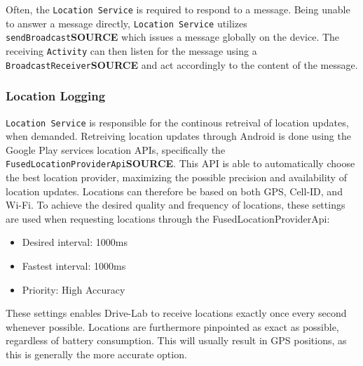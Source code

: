 Often, the \texttt{Location Service} is required to respond to a message. Being unable to answer a message directly, \texttt{Location Service} utilizes \texttt{sendBroadcast}\textbf{SOURCE} which issues a message globally on the device. The receiving \texttt{Activity} can then listen for the message using a \texttt{BroadcastReceiver}\textbf{SOURCE} and act accordingly to the content of the message. 

\subsubsection{Location Logging}\label{subsubsec:location_logging}
\texttt{Location Service} is responsible for the continous retreival of location updates, when demanded. Retreiving location updates through Android is done using the Google Play services location APIs, specifically the \texttt{FusedLocationProviderApi}\textbf{SOURCE}. This API is able to automatically choose the best location provider, maximizing the possible precision and availability of location updates. Locations can therefore be based on both GPS, Cell-ID, and Wi-Fi. To achieve the desired quality and frequency of locations, these settings are used when requesting locations through the FusedLocationProviderApi:

\begin{itemize}
\item Desired interval: 1000ms
\item Fastest interval: 1000ms
\item Priority: High Accuracy
\end{itemize}

These settings enables Drive-Lab to receive locations exactly once every second whenever possible. Locations are furthermore pinpointed as exact as possible, regardless of battery consumption. This will usually result in GPS positions, as this is generally the more accurate option.
